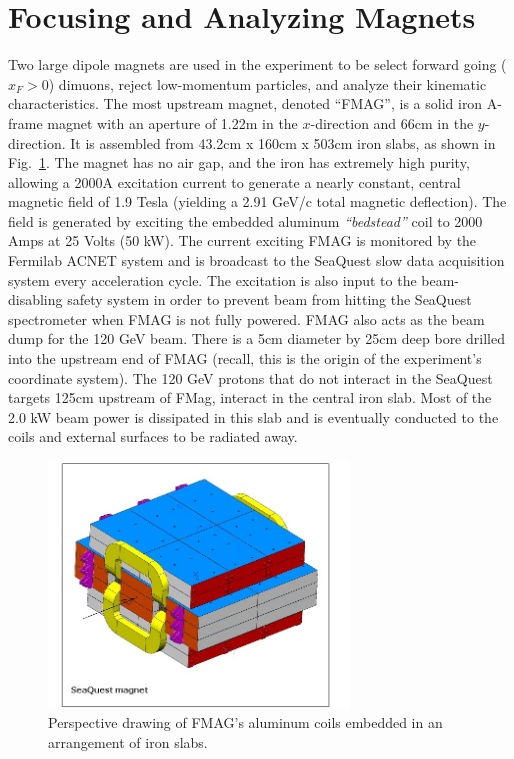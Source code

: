 \section{Focusing and Analyzing Magnets}

Two large dipole magnets are used in the experiment to be select forward going ($x_F > 0$) dimuons, reject low-momentum particles, and analyze their kinematic characteristics. The most upstream magnet, denoted ``FMAG'', is a solid iron A-frame magnet with an aperture of 1.22m in the $x$-direction and 66cm in the $y$-direction. It is assembled from 43.2cm x 160cm x 503cm iron slabs, as shown in Fig.~\ref{fig:FMag}. The magnet has no air gap, and the iron has extremely high purity, allowing a 2000A excitation current to generate a nearly constant, central magnetic field of 1.9 Tesla (yielding a 2.91 GeV/c total magnetic deflection). The field is generated by exciting the embedded aluminum \emph{``bedstead''} coil to 2000 Amps at 25 Volts (50 kW).  The current exciting FMAG is monitored by the Fermilab ACNET system and is broadcast to the SeaQuest slow data acquisition system every acceleration cycle. The excitation is also input to the beam-disabling safety system in order to prevent beam from hitting the SeaQuest spectrometer when FMAG is not fully powered. FMAG also acts as the beam dump for the 120 GeV beam. There is a 5cm diameter by 25cm deep bore drilled into the upstream end of FMAG (recall, this is the origin of the experiment's coordinate system).  The 120 GeV protons that do not interact in the SeaQuest targets 125cm upstream of FMag, interact in the central iron slab.  Most of the 2.0 kW beam power is dissipated in this slab and is eventually conducted to the coils and external surfaces to be radiated away.

\begin{figure}
	\centering
	\includegraphics[width=8cm]{figures/FMAG}
	\caption{Perspective drawing of FMAG's aluminum coils embedded in an arrangement of iron slabs.}
	\label{fig:FMag}
\end{figure}

